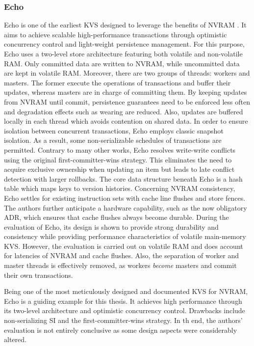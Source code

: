 \subsubsection{Echo}

Echo is one of the earliest KVS designed to leverage the benefits of NVRAM
\cite{bailey2013exploring}. It aims to achieve scalable high-performance
transactions through optimistic concurrency control and light-weight persistence
management. For this purpose, Echo uses a two-level store architecture featuring
both volatile and non-volatile RAM. Only committed data are written to NVRAM,
while uncommitted data are kept in volatile RAM. Moreover, there are two groups
of threads: workers and masters. The former execute the operations of
transactions and buffer their updates, whereas masters are in charge of
committing them. By keeping updates from NVRAM until commit, persistence
guarantees need to be enforced less often and degradation effects such as
wearing are reduced. Also, updates are buffered locally in each thread which
avoids contention on shared data. In order to ensure isolation between
concurrent transactions, Echo employs classic snapshot isolation. As a result,
some non-serializable schedules of transactions are permitted. Contrary to many
other works, Echo resolves write-write conflicts using the original
first-committer-wins strategy. This eliminates the need to acquire exclusive
ownership when updating an item but leads to late conflict detection with larger
rollbacks. The core data structure beneath Echo is a hash table which maps keys
to version histories. Concerning NVRAM consistency, Echo settles for existing
instruction sets with cache line flushes and store fences. The authors further
anticipate a hardware capability, such as the now obligatory ADR, which ensures
that cache flushes always become durable. During the evaluation of Echo, its
design is shown to provide strong durability and consistency while providing
performance characteristics of volatile main-memory KVS. However, the evaluation
is carried out on volatile RAM and does account for latencies of NVRAM and cache
flushes. Also, the separation of worker and master threads is effectively
removed, as workers \emph{become} masters and commit their own transactions.

Being one of the most meticulously designed and documented KVS for NVRAM, Echo
is a guiding example for this thesis. It achieves high performance through its
two-level architecture and optimistic concurrency control. Drawbacks include
non-serializing SI and the first-committer-wins strategy. In th end, the
authors' evaluation is not entirely conclusive as some design aspects were
considerably altered.

